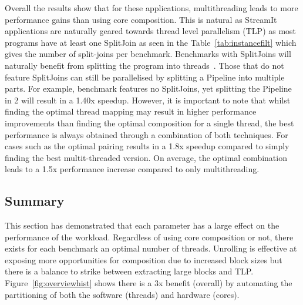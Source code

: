 Overall the results show that for these applications, multithreading leads to more performance gains than using core composition.
This is natural as StreamIt applications are naturally geared towards thread level parallelism (TLP) as most programs have at least one SplitJoin as seen in the Table~\ref{tab:instancefilt} which gives the number of split-joins per benchmark.
Benchmarks with SplitJoins will naturally benefit from splitting the program into threads~\cite{thiesStreamit2010}.
Those that do not feature SplitJoins can still be parallelised by splitting a Pipeline into multiple parts.
For example, benchmark  features no SplitJoins, yet splitting the Pipeline in 2 will result in a 1.40x speedup.
However, it is important to note that whilst finding the optimal thread mapping may result in higher performance improvements than finding the optimal composition for a single thread, the best performance is always obtained through a combination of both techniques.
For cases such as  the optimal pairing results in a 1.8x speedup compared to simply finding the best multit-threaded version.
On average, the optimal combination leads to a 1.5x performance increase compared to only multithreading.

\subsection{Summary}
This section has demonstrated that each parameter has a large effect on the performance of the workload.
Regardless of using core composition or not, there exists for each benchmark an optimal number of threads.
Unrolling is effective at exposing more opportunities for composition due to increased block sizes but there is a balance to strike between extracting large blocks and TLP.
Figure~\ref{fig:overviewhist} shows there is a 3x benefit (overall) by automating the partitioning of both the software (threads) and hardware (cores).

